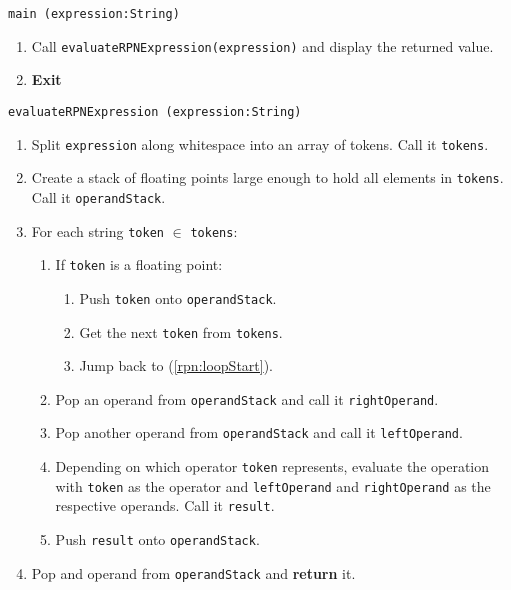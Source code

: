 \algorithm
\texttt{main (expression:String)}
\begin{enumerate}
	\item Call \texttt{evaluateRPNExpression(expression)} and display the returned value.
	\item \textbf{Exit} 
\end{enumerate}
\vspace{5mm}
\texttt{evaluateRPNExpression (expression:String)}
\begin{enumerate}
	\item Split \texttt{expression} along whitespace into an array of tokens. Call it \texttt{tokens}.
	\item Create a stack of floating points large enough to hold all elements in \texttt{tokens}. Call it \texttt{operandStack}.
	\item For each string \texttt{token} $\in$ \texttt{tokens}:
	\begin{enumerate}
		\item If \texttt{token} is a floating point:  \label{rpn:loopStart}
		\begin{enumerate}
			\item Push \texttt{token} onto \texttt{operandStack}.
			\item Get the next \texttt{token} from \texttt{tokens}.
			\item Jump back to (\ref{rpn:loopStart}).
		\end{enumerate}
		\item Pop an operand from \texttt{operandStack} and call it \texttt{rightOperand}. 
		\item Pop another operand from \texttt{operandStack} and call it \texttt{leftOperand}.
		\item Depending on which operator \texttt{token} represents, evaluate the operation with \texttt{token} as the operator
			and \texttt{leftOperand} and \texttt{rightOperand} as the respective operands. Call it \texttt{result}.
		\item Push \texttt{result} onto \texttt{operandStack}. 
	\end{enumerate}
	\item Pop and operand from \texttt{operandStack} and \textbf{return} it. 
\end{enumerate}

\sourcecode


